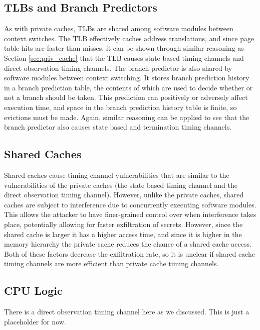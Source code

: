 \subsection{TLBs and Branch Predictors}
As with private caches, TLBs are shared among software modules between context 
switches. The TLB effectively caches address translations, and since page table 
hits are faster than misses, it can be shown through similar reasoning as 
Section \ref{sec:priv_cache} that the TLB causes state based timing channels 
and direct observation timing channels. The branch predictor is also shared by 
software modules between context switching. It stores branch prediction history 
in a branch prediction table, the contents of which are used to decide whether 
or not a branch should be taken. This prediction can positively or adversely 
affect execution time, and space in the branch prediction history table is 
finite, so evictions must be made. Again, similar reasoning can be applied to 
see that the branch predictor also causes state based and termination timing 
channels.

\subsection{Shared Caches}
Shared caches cause timing channel vulnerabilities that are similar to the 
vulnerabilities of the private caches (the state based timing channel and the 
direct observation timing channel). However, unlike the private caches, shared 
caches are subject to interference due to concurrently executing software 
modules. This allows the attacker to have finer-grained control over when 
interference takes place, potentially allowing for faster exfiltration of 
secrets. However, since the shared cache is larger it has a higher access time, 
and since it is higher in the memory hierarchy the private cache reduces the 
chance of a shared cache access. Both of these factors decrease the 
exfiltration rate, so it is unclear if shared cache timing channels are more 
efficient than private cache timing channels.

\subsection{CPU Logic}
There is a direct observation timing channel here as we discussed. This is just 
a placeholder for now.

